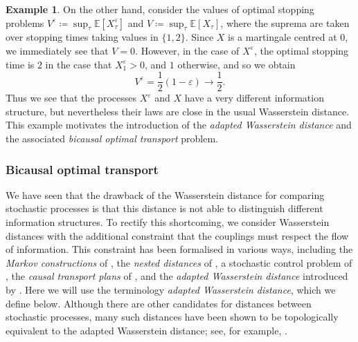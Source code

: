 \documentclass[onseside, final]{amsart}
\theoremstyle{definition}
\newtheorem{example}[theorem]{Example}
\newcommand{\E}{\mathbb E}
\numberwithin{equation}{section}
\begin{document}
\begin{example}
			On the other hand, consider the values of optimal stopping problems $V^\varepsilon \coloneqq \sup_\tau \E[X^\varepsilon_\tau]$ and $V \coloneqq \sup_\tau \E[X_\tau]$, where the suprema are taken over stopping times taking values in $\{1, 2\}$. Since $X$ is a martingale centred at $0$, we immediately see that $V = 0$. However, in the case of $X^\varepsilon$, the optimal stopping time is $2$ in the case that $X^\varepsilon_1 > 0$, and $1$ otherwise, and so we obtain
			\begin{equation}
				V^\varepsilon = \frac12 (1 - \varepsilon) \to \frac12.
			\end{equation}
			Thus we see that the processes $X^\varepsilon$ and $X$ have a very different information structure, but nevertheless their laws are close in the usual Wasserstein distance. This example motivates the introduction of the \emph{adapted Wasserstein distance} and the associated \emph{bicausal optimal transport} problem.
		\end{example}
		
		\subsubsection{Bicausal optimal transport}
			We have seen that the drawback of the Wasserstein distance for comparing stochastic processes is that this distance is not able to distinguish different information structures. To rectify this shortcoming, we consider Wasserstein distances with the additional constraint that the couplings must respect the flow of information. This constraint has been formalised in various ways, including
			the \emph{Markov constructions} of \citet{Ru85}, the \emph{nested distances} of \citet{PfPi12, PfPi14}, a stochastic control problem of \citet{BiTa19}, the \emph{causal transport plans} of \citet{La18}, and the \emph{adapted Wasserstein distance} introduced by \citet{BaBaBeEd19a}. Here we will use the terminology \emph{adapted Wasserstein distance}, which we define below. Although there are other candidates for distances between stochastic processes, many such distances have been shown to be topologically equivalent to the adapted Wasserstein distance; see, for example, \citep{BaBaBeEd19b, BoLiOb23}.
			
\end{document}
